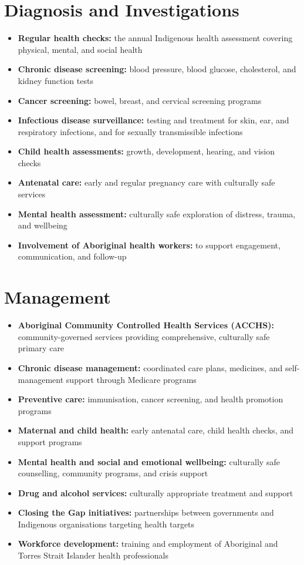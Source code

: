\section*{Diagnosis and Investigations}
\begin{itemize}
    \item \textbf{Regular health checks:} the annual Indigenous health assessment covering physical, mental, and social health
    \item \textbf{Chronic disease screening:} blood pressure, blood glucose, cholesterol, and kidney function tests
    \item \textbf{Cancer screening:} bowel, breast, and cervical screening programs
    \item \textbf{Infectious disease surveillance:} testing and treatment for skin, ear, and respiratory infections, and for sexually transmissible infections
    \item \textbf{Child health assessments:} growth, development, hearing, and vision checks
    \item \textbf{Antenatal care:} early and regular pregnancy care with culturally safe services
    \item \textbf{Mental health assessment:} culturally safe exploration of distress, trauma, and wellbeing
    \item \textbf{Involvement of Aboriginal health workers:} to support engagement, communication, and follow-up
\end{itemize}

\section*{Management}
\begin{itemize}
    \item \textbf{Aboriginal Community Controlled Health Services (ACCHS):} community-governed services providing comprehensive, culturally safe primary care
    \item \textbf{Chronic disease management:} coordinated care plans, medicines, and self-management support through Medicare programs
    \item \textbf{Preventive care:} immunisation, cancer screening, and health promotion programs
    \item \textbf{Maternal and child health:} early antenatal care, child health checks, and support programs
    \item \textbf{Mental health and social and emotional wellbeing:} culturally safe counselling, community programs, and crisis support
    \item \textbf{Drug and alcohol services:} culturally appropriate treatment and support
    \item \textbf{Closing the Gap initiatives:} partnerships between governments and Indigenous organisations targeting health targets
    \item \textbf{Workforce development:} training and employment of Aboriginal and Torres Strait Islander health professionals
\end{itemize}

